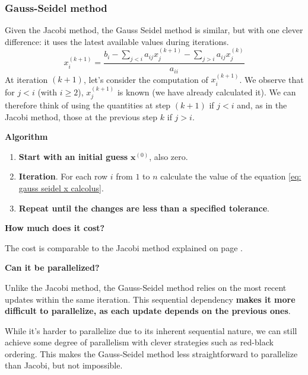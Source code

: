 \subsubsection{Gauss-Seidel method}

Given the Jacobi method, the Gauss Seidel method is similar, but with one clever difference: it uses the latest available values during iterations.
\begin{equation}\label{eq: gauss seidel x calcolus}
    x_{i}^{\left(k+1\right)} = \dfrac{b_{i} - \displaystyle\sum_{j < i} a_{ij}x_{j}^{\left(k+1\right)} - \displaystyle\sum_{j > i}a_{ij}x_{j}^{\left(k\right)}}{a_{ii}}
\end{equation}
At iteration $\left(k+1\right)$, let's consider the computation of $x_{i}^{\left(k+1\right)}$. We observe that for $j < i$ (with $i \ge 2$), $x_{j}^{\left(k+1\right)}$ is known (we have already calculated it). We can therefore think of using the quantities at step $\left(k+1\right)$ if $j<i$ and, as in the Jacobi method, those at the previous step $k$ if $j > i$.

\highspace
\begin{flushleft}
    \textcolor{Green3}{ \textbf{Algorithm}}
\end{flushleft}
\begin{enumerate}
    \item \textbf{Start with an initial guess} $\mathbf{x}^{\left(0\right)}$, also zero.
    \item \textbf{Iteration}. For each row $i$ from $1$ to $n$ calculate the value of the equation \ref{eq: gauss seidel x calcolus}.
    \item \textbf{Repeat until the changes are less than a specified tolerance}.
\end{enumerate}

\highspace
\begin{flushleft}
    \textcolor{Red2}{ \textbf{How much does it cost?}}
\end{flushleft}
The cost is comparable to the Jacobi method explained on page \pageref{general-ref: cost jacobi method}.

\highspace
\begin{flushleft}
    \textcolor{Green3}{ \textbf{Can it be parallelized?}}
\end{flushleft}
Unlike the Jacobi method, the Gauss-Seidel method relies on the most recent updates within the same iteration. This sequential dependency \textbf{makes it more difficult to parallelize, as each update depends on the previous ones}.

\highspace
While it's harder to parallelize due to its inherent sequential nature, we can still achieve some degree of parallelism with clever strategies such as red-black ordering. This makes the Gauss-Seidel method less straightforward to parallelize than Jacobi, but not impossible.
